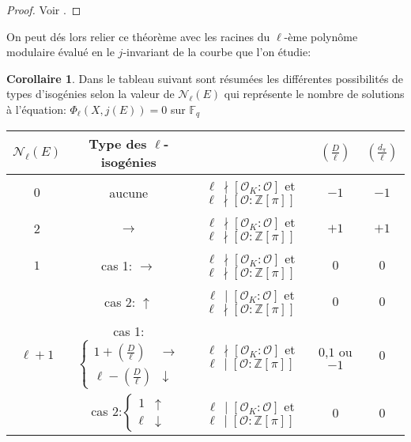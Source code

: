 \documentclass[10pt,a4paper]{book}
\theoremstyle{plain}
\theoremstyle{definition}
\theoremstyle{definition}
\newtheorem{cor}[thm]{Corollaire}
\theoremstyle{definition}
\theoremstyle{definition}
\theoremstyle{remark}
\theoremstyle{remark}
\theoremstyle{definition}
\begin{document}
\begin{proof}
Voir \cite[Proposition 23]{Kohel96}.
\end{proof}

On peut dés lors relier ce théorème avec les racines du $\ell$-ème polynôme modulaire évalué en le $j$-invariant de la courbe que l'on étudie:

\begin{cor}
\label{cor:tab:vol} 
Dans le tableau suivant sont résumées les différentes possibilités de types d'isogénies selon la valeur de $\mathcal{N}_{\ell}(E)$ qui représente le nombre de solutions à l'équation: $\Phi_{\ell}(X,j(E))=0$ sur $\mathbb{F}_q$
\newline
\begin{tabular}{|c|c|c|c|c|}
\hline 
$\mathcal{N}_{\ell}(E)$ & Type des $\ell$-isogénies &  & $\left(\frac{D}{\ell}\right)$ & $\left(\frac{d_{\pi}}{\ell}\right)$\tabularnewline
\hline 
\hline 
$0$ & aucune & $\ell \,\nmid[\mathcal{O}_{K}:\mathcal{O}]$ et $\ell \,\nmid[\mathcal{O}:\mathbb{Z}[\pi]]$  & $-1$ & $-1$\\
\hline 
$2$ & $\rightarrow$ & $\ell \,\nmid[\mathcal{O}_{K}:\mathcal{O}]$ et $\ell \,\nmid[\mathcal{O}:\mathbb{Z}[\pi]]$  & $+1$ & $+1$\\
\hline 
$1$ & cas 1: $\rightarrow$ & $\ell\,\nmid[\mathcal{O}_{K}:\mathcal{O}]$ et $\ell\,\nmid[\mathcal{O}:\mathbb{Z}[\pi]]$  & $0$ & $0$\\

\cline{2-5} & cas 2: $\uparrow$ & $\ell\,\mid[\mathcal{O}_{K}:\mathcal{O}]$ et $\ell\,\nmid[\mathcal{O}:\mathbb{Z}[\pi]]$  & $0$ & $0$\\
\hline 
$\ell+1$ & cas 1:$\left\{ \begin{array}{cc}
1+\left(\frac{D}{\ell}\right) & \rightarrow\\
\ell-\left(\frac{D}{\ell}\right) & \downarrow
\end{array}\right.$ & $\ell \,\nmid[\mathcal{O}_{K}:\mathcal{O}]$ et $\ell \,\mid[\mathcal{O}:\mathbb{Z}[\pi]]$  & $0$,$1$ ou $-1$ & $0$\\
 
\cline{2-5} & cas 2:$\left\{ \begin{array}{cc}
1 & \uparrow\\
\ell & \downarrow
\end{array}\right.$ & $\ell \,\mid[\mathcal{O}_{K}:\mathcal{O}]$ et $\ell \,\mid[\mathcal{O}:\mathbb{Z}[\pi]]$  & $0$ & $0$ \\
\hline 
\end{tabular}
\end{cor}
\end{document}

